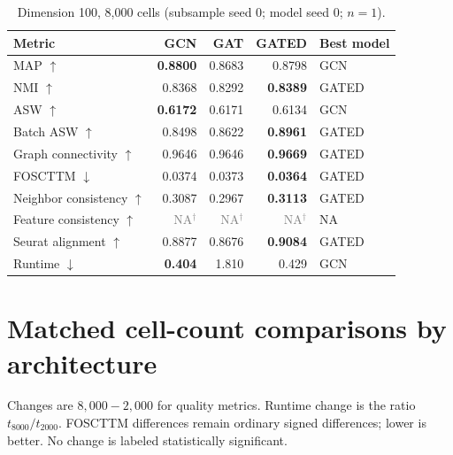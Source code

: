 \documentclass[10pt]{article}
\begin{document}
\begin{table}[H]\centering\small
\caption{Dimension 100, 8,000 cells (subsample seed 0; model seed 0; $n=1$).}
\begin{tabular}{@{}lrrrl@{}}\toprule
Metric & GCN & GAT & GATED & Best model \\\midrule
MAP $\uparrow$ & \textbf{0.8800} & 0.8683 & 0.8798 & GCN \\
NMI $\uparrow$ & 0.8368 & 0.8292 & \textbf{0.8389} & GATED \\
ASW $\uparrow$ & \textbf{0.6172} & 0.6171 & 0.6134 & GCN \\
Batch ASW $\uparrow$ & 0.8498 & 0.8622 & \textbf{0.8961} & GATED \\
Graph connectivity $\uparrow$ & 0.9646 & 0.9646 & \textbf{0.9669} & GATED \\
FOSCTTM $\downarrow$ & 0.0374 & 0.0373 & \textbf{0.0364} & GATED \\
Neighbor consistency $\uparrow$ & 0.3087 & 0.2967 & \textbf{0.3113} & GATED \\
Feature consistency $\uparrow$ & \textcolor{gray}{NA$^{\dagger}$} & \textcolor{gray}{NA$^{\dagger}$} & \textcolor{gray}{NA$^{\dagger}$} & NA \\
Seurat alignment $\uparrow$ & 0.8877 & 0.8676 & \textbf{0.9084} & GATED \\
Runtime $\downarrow$ & \textbf{0.404} & 1.810 & 0.429 & GCN \\
\bottomrule\end{tabular}
\end{table}
\section{Matched cell-count comparisons by architecture}
Changes are $8{,}000-2{,}000$ for quality metrics. Runtime change is the ratio $t_{8000}/t_{2000}$. FOSCTTM differences remain ordinary signed differences; lower is better. No change is labeled statistically significant.
\end{document}
